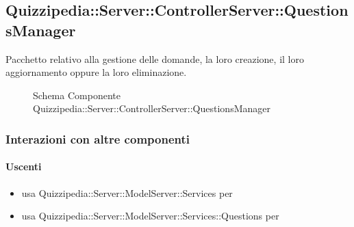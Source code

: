 \subsection{Quizzipedia::Server::ControllerServer::QuestionsManager}
Pacchetto relativo alla gestione delle domande, la loro creazione, il loro aggiornamento oppure la loro eliminazione.
\begin{figure}[H]
\centering
\noindent{}
\caption[Schema Componente Quizzipedia::Server::ControllerServer::QuestionsManager]{Schema Componente Quizzipedia::Server::ControllerServer::QuestionsManager}
\end{figure}
\subsubsection{Interazioni con altre componenti}
\paragraph{Uscenti}
\begin{itemize}
\item usa Quizzipedia::Server::ModelServer::Services per 
\item usa Quizzipedia::Server::ModelServer::Services::Questions per 
\end{itemize}
